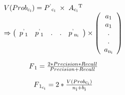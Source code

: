   \begin{equation}
    \begin{array}{l}
      V(Prob\textsubscript{c\textsubscript{i}}) = 
      P\textsuperscript{'}\textsubscript{c\textsubscript{i}}
      \;\times\; A\textsubscript{c\textsubscript{i}}\textsuperscript{T}
      \\
      \Rightarrow	
      \left( \begin{array}{ccccc}
      p\textsuperscript{'}\textsubscript{1} & p\textsuperscript{'}\textsubscript{1} & .&. & 
      p\textsuperscript{'}\textsubscript{n\textsubscript{i}}
      \end{array} \right)
      \times
      \left( \begin{array}{ccccc}
      a\textsubscript{1} \\
      a\textsubscript{1} \\
      . \\
      . \\
      a\textsubscript{n\textsubscript{i}} \\
      \end{array} \right)

    \end{array}
    \label{eqn:Precision}
  \end{equation}

    \begin{equation}
      \begin{array}{l}
        F\textsubscript{1} = \frac{2 * Precision * Recall} {Precision + Recall}
      \end{array}
    \label{eqn:F1}
  \end{equation}

  \begin{equation}
    \begin{array}{l}
      F\textsubscript{1\textsubscript{c\textsubscript{i}}} = 2 * 
      \frac{
        V(Prob\textsubscript{c\textsubscript{i}})
      }
      {
        n\textsubscript{i} + b\textsubscript{i}
      }
    \end{array}
    \label{eqn:Precision}
  \end{equation}